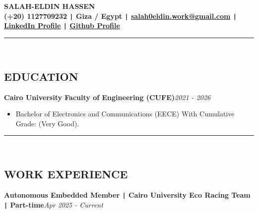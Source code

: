 \documentclass[11pt,a4paper]{article}
\begin{document}
\begin{center}
\fontsize{22}{22}\textbf{SALAH-ELDIN HASSEN}\\[0.2cm]
\fontsize{11}{12}\textbf{ (+20) 1127709232 \texttt{|} Giza / Egypt \texttt{|}  \href{mailto:salah0eldin.work@gmail.com}{salah0eldin.work@gmail.com} \texttt{{|}} \href{https://www.linkedin.com/in/salah-eldin-hassen-5bba10250/}{LinkedIn Profile} \texttt{{|}} \href{https://github.com/salah0eldin}{Github Profile}}\\[-0.1cm]
\rule{\textwidth}{0.3pt}\\
\end{center}
\vspace{-0.9cm}
\begin{center}
\section*{\fontsize{14}{18}\textbf\selectfont EDUCATION}
\end{center}
\vspace{-0.2cm}
\renewcommand\labelitemi{\raisebox{0.2ex}{\scriptsize$\bullet$}}
\begin{flushleft}
\textbf{Cairo University Faculty of Engineering (CUFE)}\hfill\textit{2021 - 2026}\\
\end{flushleft}
\vspace{-0.6cm}
\begin{itemize}
\item \setlength{\itemsep}{-0.0em} Bachelor of Electronics and Communications (EECE) With Cumulative Grade: (Very Good).
\end{itemize}
\vspace{-0.3cm}
\vspace{-0.2cm}
\rule{\textwidth}{0.3pt}\\
\vspace{-0.9cm}
\begin{center}
\section*{\fontsize{14}{ 18 }\textbf\selectfont WORK EXPERIENCE}
\end{center}
\vspace{-0.2cm}
\begin{flushleft}
\textbf{Autonomous Embedded Member \texttt{|} Cairo University Eco Racing Team \texttt{|} Part-time}\hfill\textit{Apr 2025 - Current}\\
\end{flushleft}
\end{document}
